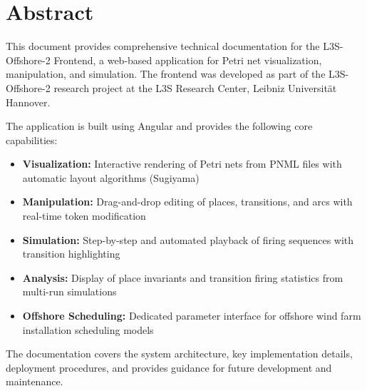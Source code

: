 \chapter*{Abstract}

This document provides comprehensive technical documentation for the L3S-Offshore-2 Frontend, a web-based application for Petri net visualization, manipulation, and simulation. The frontend was developed as part of the L3S-Offshore-2 research project at the L3S Research Center, Leibniz Universität Hannover.

The application is built using Angular and provides the following core capabilities:
\begin{itemize}
    \item \textbf{Visualization:} Interactive rendering of Petri nets from PNML files with automatic layout algorithms (Sugiyama)
    \item \textbf{Manipulation:} Drag-and-drop editing of places, transitions, and arcs with real-time token modification
    \item \textbf{Simulation:} Step-by-step and automated playback of firing sequences with transition highlighting
    \item \textbf{Analysis:} Display of place invariants and transition firing statistics from multi-run simulations
    \item \textbf{Offshore Scheduling:} Dedicated parameter interface for offshore wind farm installation scheduling models
\end{itemize}

The documentation covers the system architecture, key implementation details, deployment procedures, and provides guidance for future development and maintenance.

\clearpage
